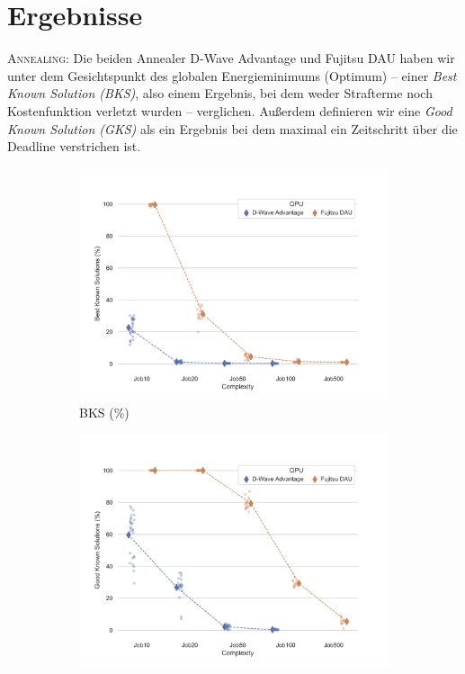\documentclass[twoside,twocolumn]{article}
\begin{document}

\section{Ergebnisse}
\textsc{Annealing:} Die beiden Annealer D-Wave Advantage und Fujitsu DAU haben wir unter dem Gesichtspunkt des globalen Energieminimums (Optimum) -- einer \textit{Best Known Solution (BKS)}, also einem Ergebnis, bei dem weder Strafterme noch Kostenfunktion verletzt wurden -- verglichen. Außerdem definieren wir eine  \textit{Good Known Solution (GKS)} als ein Ergebnis bei dem maximal ein Zeitschritt über die Deadline verstrichen ist. 

\begin{figure}[H]
        \centering
        \begin{subfigure}[b]{0.49\textwidth}
            \centering
            \includegraphics[trim={0.75cm 0.5cm 1.25cm 1.7cm}, clip,width=\textwidth]{images/Best Known Solutions by Complexity.png}
            \caption[]%
            {{\small BKS (\%)}}    
            \label{fig:BKS}
        \end{subfigure}
        \begin{subfigure}[b]{0.49\textwidth}  
            \centering 
            \includegraphics[trim={0.75cm 0.5cm 1.25cm 1.7cm}, clip,width=\textwidth]{images/Good Known Solutions by Complexity.png}

\end{subfigure}
\end{figure}
\end{document}
